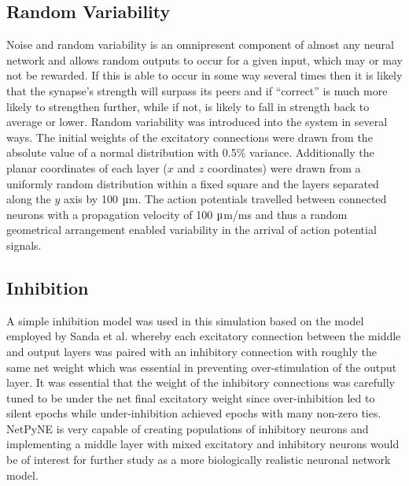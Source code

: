 \documentclass[11pt, twocolumn]{article}
\begin{document}
\subsection*{Random Variability}
Noise and random variability is an omnipresent component of almost any neural network and allows random outputs to occur for a given input, which may or may not be rewarded. If this is able to occur in some way several times then it is likely that the synapse's strength will surpass its peers and if ``correct'' is much more likely to strengthen further, while if not, is likely to fall in strength back to average or lower. Random variability was introduced into the system in several ways. The initial weights of the excitatory connections were drawn from the absolute value of a normal distribution with 0.5\% variance. Additionally the planar coordinates of each layer ($x$ and $z$ coordinates) were drawn from a uniformly random distribution within a fixed square and the layers separated along the $y$ axis by 100 $\micro$m. The action potentials travelled between connected neurons with a propagation velocity of 100 $\micro$m/ms and thus a random geometrical arrangement enabled variability in the arrival of action potential signals.

\subsection*{Inhibition}
A simple inhibition model was used in this simulation based on the model employed by Sanda et al. \cite{sanda2017multi} whereby each excitatory connection between the middle and output layers was paired with an inhibitory connection with roughly the same net weight which was essential in preventing over-stimulation of the output layer. It was essential that the weight of the inhibitory connections was carefully tuned to be under the net final excitatory weight since over-inhibition led to silent epochs while under-inhibition achieved epochs with many non-zero ties. \acs{NetPyNE} is very capable of creating populations of inhibitory neurons and implementing a middle layer with mixed excitatory and inhibitory neurons would be of interest for further study as a more biologically realistic neuronal network model.
\end{document}
